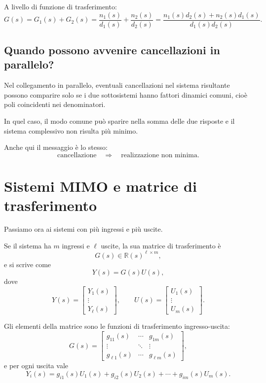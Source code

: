 A livello di funzione di trasferimento:
\[
G(s)=G_1(s)+G_2(s)
=
\frac{n_1(s)}{d_1(s)}+\frac{n_2(s)}{d_2(s)}
=
\frac{n_1(s)d_2(s)+n_2(s)d_1(s)}{d_1(s)d_2(s)}.
\]

\subsection{Quando possono avvenire cancellazioni in parallelo?}

Nel collegamento in parallelo, eventuali cancellazioni nel sistema risultante possono comparire solo se i due sottosistemi hanno fattori dinamici comuni, cioè poli coincidenti nei denominatori.

In quel caso, il modo comune può sparire nella somma delle due risposte e il sistema complessivo non risulta più minimo.

Anche qui il messaggio è lo stesso:
\[
\text{cancellazione} \quad \Longrightarrow \quad \text{realizzazione non minima}.
\]

\bigskip

\section{Sistemi MIMO e matrice di trasferimento}

Passiamo ora ai sistemi con più ingressi e più uscite.

Se il sistema ha \(m\) ingressi e \(\ell\) uscite, la sua matrice di trasferimento è
\[
G(s)\in\mathbb R(s)^{\ell\times m},
\]
e si scrive come
\[
Y(s)=G(s)U(s),
\]
dove
\[
Y(s)=
\begin{bmatrix}
Y_1(s)\\ \vdots \\ Y_\ell(s)
\end{bmatrix},
\qquad
U(s)=
\begin{bmatrix}
U_1(s)\\ \vdots \\ U_m(s)
\end{bmatrix}.
\]

Gli elementi della matrice sono le funzioni di trasferimento ingresso-uscita:
\[
G(s)=
\begin{bmatrix}
g_{11}(s) & \cdots & g_{1m}(s)\\
\vdots & \ddots & \vdots\\
g_{\ell 1}(s) & \cdots & g_{\ell m}(s)
\end{bmatrix},
\]
e per ogni uscita vale
\[
Y_i(s)=g_{i1}(s)U_1(s)+g_{i2}(s)U_2(s)+\cdots+g_{im}(s)U_m(s).
\]

